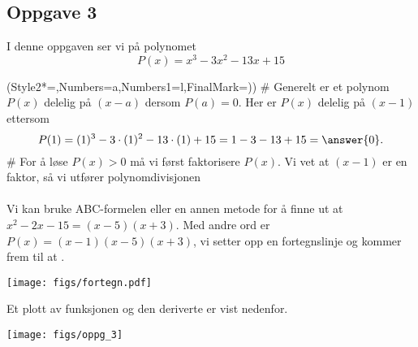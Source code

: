 \subsection*{Oppgave 3}
I denne oppgaven ser vi på polynomet
\begin{equation*}
	P(x) = x^3 - 3x^2 - 13x + 15
\end{equation*}
\begin{easylist}[enumerate]
	\ListProperties(Style2*=,Numbers=a,Numbers1=l,FinalMark={)})
	# Generelt er et polynom $P(x)$ delelig på $(x-a)$ dersom $P(a) = 0$.
	Her er $P(x)$ delelig på $(x-1)$ ettersom 
	\begin{equation*}
	P(1) = (1)^3 - 3\cdot(1)^2 - 13\cdot(1) + 15 = 1 - 3 - 13 + 15 = \answer{0}.
	\end{equation*}
	# For å løse $P(x) > 0$ må vi først faktorisere $P(x)$.
	Vi vet at $(x-1)$ er en faktor, så vi utfører polynomdivisjonen \\
	 \\
	Vi kan bruke ABC-formelen eller en annen metode for å finne ut at $x^2 - 2x -15 = (x - 5)(x + 3)$. 
	Med andre ord er $P(x) = (x - 1)(x - 5)(x + 3)$, vi setter opp en fortegnslinje og kommer frem til at .
	
\end{easylist}

\begin{center}
	\texttt{[image: figs/fortegn.pdf]}
\end{center}
Et plott av funksjonen og den deriverte er vist nedenfor.
\begin{center}
	\texttt{[image: figs/oppg\_3]}
\end{center}

